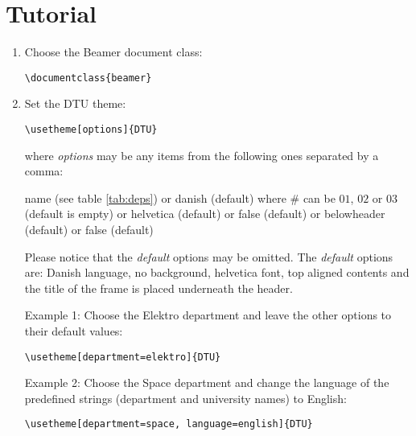 \documentclass{article}
\begin{document}
        \section{Tutorial}
        \begin{enumerate}
                \item Choose the Beamer document class:
                
                \begin{lstlisting}[name=code]
\documentclass{beamer}
                \end{lstlisting}
                
                \item Set the DTU theme:
                \begin{lstlisting}[name=code,firstnumber=auto]
\usetheme[options]{DTU}
                \end{lstlisting}
                where \textit{options} may be any items from the following ones separated by a comma:

                        name (see table \ref{tab:deps})
                         or {\color{blue}danish} (default)
                         where {\color{blue}\#} can be {\color{blue}$01$}, {\color{blue}$02$} or {\color{blue}$03$} (default is empty)
                         or {\color{blue}helvetica} (default)
                         or {\color{blue}false} (default)
                         or {\color{blue}belowheader} (default)
                         or {\color{blue}false} (default)

                Please notice that the \textit{default} options may be omitted. The \textit{default} options are: Danish language, no background, helvetica font, top aligned contents and the title of the frame is placed underneath the header.
                
                Example 1:
                Choose the Elektro department and leave the other options to their default values:
                \begin{lstlisting}[name=code,firstnumber=2]
\usetheme[department=elektro]{DTU}
                \end{lstlisting}
                
                Example 2:
                Choose the Space department and change the language of the predefined strings (department and university names) to English:
                \begin{lstlisting}[name=code,firstnumber=2]
\usetheme[department=space, language=english]{DTU}
                \end{lstlisting}
                

\end{enumerate}
\end{document}
